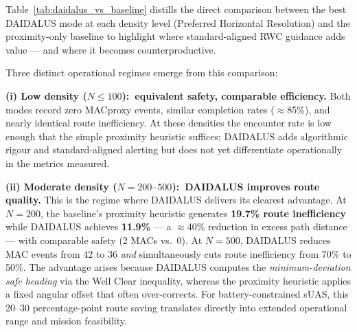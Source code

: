 Table~\ref{tab:daidalus_vs_baseline} distills the direct comparison between the best DAIDALUS
mode at each density level (Preferred Horizontal Resolution) and the proximity-only baseline
to highlight where standard-aligned RWC guidance adds value --- and where it becomes
counterproductive.

\begin{table}[htbp]
\caption{DAIDALUS (Preferred Horizontal Resolution) vs.\ No-DAIDALUS Baseline --- direct
  comparison at each density level.  $\Delta$Ineff.\ shows the route inefficiency
  \emph{reduction} provided by DAIDALUS (positive = DAIDALUS is more efficient).}
\label{tab:daidalus_vs_baseline}
\centering
\renewcommand{\arraystretch}{1.2}
\end{table}

Three distinct operational regimes emerge from this comparison:

\textbf{(i) Low density ($N \leq 100$):\ equivalent safety, comparable efficiency.}
Both modes record zero MACproxy events, similar completion rates ($\approx$85\%), and
nearly identical route inefficiency. At these densities the encounter rate is low enough
that the simple proximity heuristic suffices; DAIDALUS adds algorithmic rigour and
standard-aligned alerting but does not yet differentiate operationally in the metrics
measured.

\textbf{(ii) Moderate density ($N = 200$--$500$):\ DAIDALUS improves route quality.}
This is the regime where DAIDALUS delivers its clearest advantage. At $N = 200$, the
baseline's proximity heuristic generates \textbf{19.7\% route inefficiency} while DAIDALUS
achieves \textbf{11.9\%} --- a $\approx$40\% reduction in excess path distance --- with
comparable safety (2 MACs vs.\ 0). At $N = 500$, DAIDALUS reduces MAC events from 42 to 36
\emph{and} simultaneously cuts route inefficiency from 70\% to 50\%. The advantage arises
because DAIDALUS computes the \emph{minimum-deviation safe heading} via the Well Clear
inequality, whereas the proximity heuristic applies a fixed angular offset that often
over-corrects. For battery-constrained sUAS, this 20--30 percentage-point route saving
translates directly into extended operational range and mission feasibility.


